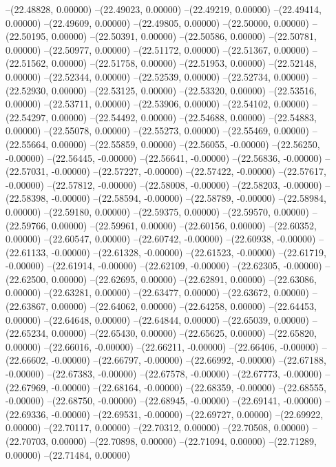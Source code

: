 --(22.48828, 0.00000)
--(22.49023, 0.00000)
--(22.49219, 0.00000)
--(22.49414, 0.00000)
--(22.49609, 0.00000)
--(22.49805, 0.00000)
--(22.50000, 0.00000)
--(22.50195, 0.00000)
--(22.50391, 0.00000)
--(22.50586, 0.00000)
--(22.50781, 0.00000)
--(22.50977, 0.00000)
--(22.51172, 0.00000)
--(22.51367, 0.00000)
--(22.51562, 0.00000)
--(22.51758, 0.00000)
--(22.51953, 0.00000)
--(22.52148, 0.00000)
--(22.52344, 0.00000)
--(22.52539, 0.00000)
--(22.52734, 0.00000)
--(22.52930, 0.00000)
--(22.53125, 0.00000)
--(22.53320, 0.00000)
--(22.53516, 0.00000)
--(22.53711, 0.00000)
--(22.53906, 0.00000)
--(22.54102, 0.00000)
--(22.54297, 0.00000)
--(22.54492, 0.00000)
--(22.54688, 0.00000)
--(22.54883, 0.00000)
--(22.55078, 0.00000)
--(22.55273, 0.00000)
--(22.55469, 0.00000)
--(22.55664, 0.00000)
--(22.55859, 0.00000)
--(22.56055, -0.00000)
--(22.56250, -0.00000)
--(22.56445, -0.00000)
--(22.56641, -0.00000)
--(22.56836, -0.00000)
--(22.57031, -0.00000)
--(22.57227, -0.00000)
--(22.57422, -0.00000)
--(22.57617, -0.00000)
--(22.57812, -0.00000)
--(22.58008, -0.00000)
--(22.58203, -0.00000)
--(22.58398, -0.00000)
--(22.58594, -0.00000)
--(22.58789, -0.00000)
--(22.58984, 0.00000)
--(22.59180, 0.00000)
--(22.59375, 0.00000)
--(22.59570, 0.00000)
--(22.59766, 0.00000)
--(22.59961, 0.00000)
--(22.60156, 0.00000)
--(22.60352, 0.00000)
--(22.60547, 0.00000)
--(22.60742, -0.00000)
--(22.60938, -0.00000)
--(22.61133, -0.00000)
--(22.61328, -0.00000)
--(22.61523, -0.00000)
--(22.61719, -0.00000)
--(22.61914, -0.00000)
--(22.62109, -0.00000)
--(22.62305, -0.00000)
--(22.62500, 0.00000)
--(22.62695, 0.00000)
--(22.62891, 0.00000)
--(22.63086, 0.00000)
--(22.63281, 0.00000)
--(22.63477, 0.00000)
--(22.63672, 0.00000)
--(22.63867, 0.00000)
--(22.64062, 0.00000)
--(22.64258, 0.00000)
--(22.64453, 0.00000)
--(22.64648, 0.00000)
--(22.64844, 0.00000)
--(22.65039, 0.00000)
--(22.65234, 0.00000)
--(22.65430, 0.00000)
--(22.65625, 0.00000)
--(22.65820, 0.00000)
--(22.66016, -0.00000)
--(22.66211, -0.00000)
--(22.66406, -0.00000)
--(22.66602, -0.00000)
--(22.66797, -0.00000)
--(22.66992, -0.00000)
--(22.67188, -0.00000)
--(22.67383, -0.00000)
--(22.67578, -0.00000)
--(22.67773, -0.00000)
--(22.67969, -0.00000)
--(22.68164, -0.00000)
--(22.68359, -0.00000)
--(22.68555, -0.00000)
--(22.68750, -0.00000)
--(22.68945, -0.00000)
--(22.69141, -0.00000)
--(22.69336, -0.00000)
--(22.69531, -0.00000)
--(22.69727, 0.00000)
--(22.69922, 0.00000)
--(22.70117, 0.00000)
--(22.70312, 0.00000)
--(22.70508, 0.00000)
--(22.70703, 0.00000)
--(22.70898, 0.00000)
--(22.71094, 0.00000)
--(22.71289, 0.00000)
--(22.71484, 0.00000)
